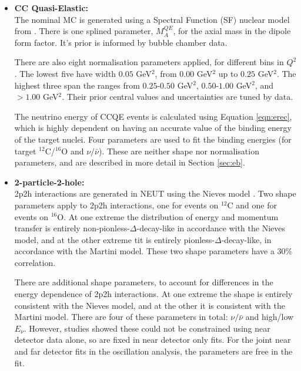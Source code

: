 \begin{itemize}

\item \textbf{CC Quasi-Elastic:}\\
The nominal MC is generated using a Spectral Function (SF) nuclear model from \cite{benhar}. There is one splined parameter, $M^{QE}_{A}$, for the axial mass in the dipole form factor. It's prior is informed by bubble chamber data\cite{tn344}. 

There are also eight normalisation parameters applied, for different bins in $Q^2$. The lowest five have width $0.05$ GeV$^2$, from $0.00$ GeV$^2$ up to $0.25$ GeV$^2$. The highest three span the ranges from $0.25$-$0.50$ GeV$^2$, $0.50$-$1.00$ GeV$^2$, and $>1.00$ GeV$^2$. Their prior central values and uncertainties are tuned by \minerva \cite{minerva} data. 

The neutrino energy of CCQE events is calculated using Equation \ref{eqn:erec}, which is highly dependent on having an accurate value of the binding energy of the target nuclei. Four parameters are used to fit the binding energies (for target $^{12}$C/$^{16}$O and $\nu/\bar{\nu}$). These are neither shape nor normalisation parameters, and are described in more detail in Section \ref{sec:eb}.

\item \textbf{2-particle-2-hole:}\\
2p2h interactions are generated in \textsc{NEUT} using the Nieves model \cite{Nieves}. Two shape parameters apply to 2p2h interactions, one for events on $^{12}$C and one for events on $^{16}$O.  At one extreme the distribution of energy and momentum transfer is entirely non-pionless-$\Delta$-decay-like in accordance with the Nieves model, and at the other extreme tit is entirely pionless-$\Delta$-decay-like, in accordance with the Martini model\cite{Martini}. These two shape parameters have a 30$\%$ correlation.

There are additional shape parameters, to account for differences in the energy dependence of 2p2h interactions. At one extreme the shape is entirely consistent with the Nieves model, and at the other it is consistent with the Martini model. There are four of these parameters in total: $\nu/\bar{\nu}$ and high/low $E_{\nu}$. However, studies showed these could not be constrained using near detector data alone, so are fixed in near detector only fits. For the joint near and far detector fits in the oscillation analysis, the parameters are free in the fit. 


\end{itemize}
